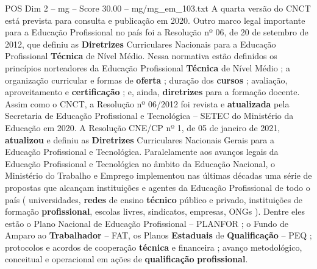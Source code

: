 \begin{textsample}{POS Dim 2 – mg – Score 30.00 – mg/mg\_em\_103.txt}
A quarta versão do CNCT está prevista para consulta e publicação em 2020.
Outro marco legal importante para a Educação Profissional no país foi a Resolução nº 06, de 20 de setembro de 2012, que definiu as \textbf{Diretrizes} Curriculares Nacionais para a Educação Profissional \textbf{Técnica} de Nível Médio.
Nessa normativa estão definidos os princípios norteadores da Educação Profissional \textbf{Técnica} de Nível Médio ; a organização curricular e formas de \textbf{oferta} ; duração dos \textbf{cursos} ; avaliação, aproveitamento e \textbf{certificação} ; e, ainda, \textbf{diretrizes} para a formação docente.
Assim como o CNCT, a Resolução nº 06/2012 foi revista e \textbf{atualizada} pela Secretaria de Educação Profissional e Tecnológica – SETEC do Ministério da Educação em 2020.
A Resolução CNE/CP nº 1, de 05 de janeiro de 2021, \textbf{atualizou} e definiu as \textbf{Diretrizes} Curriculares Nacionais Gerais para a Educação Profissional e Tecnológica.
Paralelamente aos avanços legais da Educação Profissional e Tecnológica no âmbito da Educação Nacional, o Ministério do Trabalho e Emprego implementou nas últimas décadas uma série de propostas que alcançam instituições e agentes da Educação Profissional de todo o país ( universidades, \textbf{redes} de ensino \textbf{técnico} público e privado, instituições de formação \textbf{profissional}, escolas livres, sindicatos, empresas, ONGs ).
Dentre eles estão o Plano Nacional de Educação Profissional – PLANFOR ; o Fundo de Amparo ao \textbf{Trabalhador} – FAT, os Planos \textbf{Estaduais} de \textbf{Qualificação} – PEQ ; protocolos e acordos de cooperação \textbf{técnica} e financeira ; avanço metodológico, conceitual e operacional em ações de \textbf{qualificação} \textbf{profissional}.

\end{textsample}
